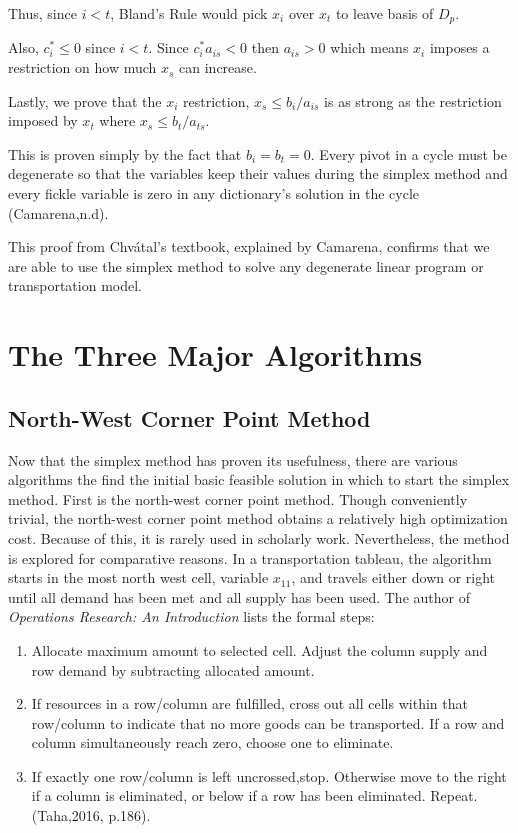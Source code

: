 \documentclass{article}
\begin{document}
Thus, since $i<t$, Bland's Rule would pick $x_i$ over $x_t$ to leave basis of $D_p$. 

Also, $c^*_i \leq 0 $ since $i<t$. Since $c^*_ia_{is} < 0 $ then $a_{is} > 0$ which means $x_i$ imposes a restriction on how much $x_s$ can increase. 

Lastly, we prove that the $x_i$ restriction, $x_s \leq b_i/a_{is}$ is as strong as the restriction imposed by $x_t$ where $x_s \leq b_t/a_{ts}$. 

This is proven simply by the fact that $b_i=b_t=0$. Every pivot in a cycle must be degenerate so that the variables keep their values during the simplex method and every fickle variable is zero in any dictionary's solution in the cycle (Camarena,n.d). 

This proof from Chvátal's textbook, explained by Camarena, confirms that we are able to use the simplex method to solve any degenerate linear program or transportation model. 

\section{The Three Major Algorithms}
\subsection{North-West Corner Point Method}
Now that the simplex method has proven its usefulness, there are various algorithms the find the initial basic feasible solution in which to start the simplex method. First is the north-west corner point method. Though conveniently trivial, the north-west corner point method obtains a relatively high optimization cost. Because of this, it is rarely used in scholarly work. Nevertheless, the method is explored for comparative reasons. In a transportation tableau, the algorithm starts in the most north west cell, variable $x_{11}$, and travels either down or right until all demand has been met and all supply has been used. The author of \emph{Operations Research: An Introduction} lists the formal steps:
\begin{enumerate}
     \item Allocate maximum amount to selected cell. Adjust the column supply and row demand by subtracting allocated amount.
    \item If resources in a row/column are fulfilled, cross out all cells within that row/column to indicate that no more goods can be transported. If a row and column simultaneously reach zero, choose one to eliminate. 
    \item If exactly one row/column is left uncrossed,stop. Otherwise move to the right if a column is eliminated, or below if a row has been eliminated. Repeat. (Taha,2016, p.186).
\end{enumerate}
    
\end{document}
